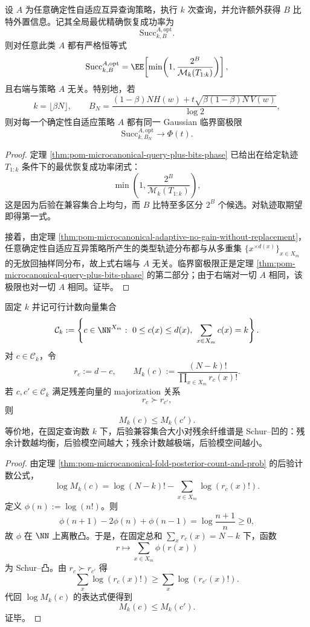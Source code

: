 \begin{theorem}[带外置信息的最优恢复率对策略完全失明]\label{thm:conclusion-microcanonical-query-sidebits-strategy-blind}
设 \(A\) 为任意确定性自适应互异查询策略，执行 \(k\) 次查询，并允许额外获得 \(B\) 比特外置信息。记其全局最优精确恢复成功率为
\[
\mathrm{Succ}^{A,\mathrm{opt}}_{k,B}.
\]
则对任意此类 \(A\) 都有严格恒等式
\[
\mathrm{Succ}^{A,\mathrm{opt}}_{k,B}
=
\EE\!\left[\min\!\left(1,\frac{2^B}{\mathcal M_k(T_{1:k})}\right)\right],
\]
且右端与策略 \(A\) 无关。特别地，若
\[
k=\lfloor \beta N\rfloor,
\qquad
B_N=\frac{(1-\beta)NH(w)+t\sqrt{\beta(1-\beta)N\,V(w)}}{\log 2},
\]
则对每一个确定性自适应策略 \(A\) 都有同一 Gaussian 临界窗极限
\[
\mathrm{Succ}^{A,\mathrm{opt}}_{k,B_N}\longrightarrow \Phi(t).
\]
\end{theorem}
\begin{proof}
定理 \ref{thm:pom-microcanonical-query-plus-bits-phase} 已给出在给定轨迹 \(T_{1:k}\) 条件下的最优恢复成功率闭式：
\[
\min\!\left(1,\frac{2^B}{\mathcal M_k(T_{1:k})}\right),
\]
这是因为后验在兼容集合上均匀，而 \(B\) 比特至多区分 \(2^B\) 个候选。对轨迹取期望即得第一式。

接着，由定理 \ref{thm:pom-microcanonical-adaptive-no-gain-without-replacement}，任意确定性自适应互异策略所产生的类型轨迹分布都与从多重集 \(\{x^{\times d(x)}\}_{x\in X_m}\) 的无放回抽样同分布，故上式右端与 \(A\) 无关。临界窗极限正是定理 \ref{thm:pom-microcanonical-query-plus-bits-phase} 的第二部分；由于右端对一切 \(A\) 相同，该极限也对一切 \(A\) 相同。证毕。
\end{proof}

\begin{theorem}\label{thm:conclusion-posterior-moduli-majorization-monotonicity}
固定 \(k\) 并记可行计数向量集合
\[
\mathcal C_k:=
\left\{
c\in \NN^{X_m}:\ 0\le c(x)\le d(x),\ \sum_{x\in X_m}c(x)=k
\right\}.
\]
对 \(c\in \mathcal C_k\)，令
\[
r_c:=d-c,
\qquad
M_k(c):=\frac{(N-k)!}{\prod_{x\in X_m} r_c(x)!}.
\]
若 \(c,c'\in\mathcal C_k\) 满足残差向量的 majorization 关系
\[
r_c\succ r_{c'},
\]
则
\[
M_k(c)\le M_k(c').
\]
等价地，在固定查询数 \(k\) 下，后验兼容集合大小对残余纤维谱是 Schur--凹的：残余计数越均衡，后验模空间越大；残余计数越极端，后验模空间越小。
\end{theorem}
\begin{proof}
由定理 \ref{thm:pom-microcanonical-fold-posterior-count-and-prob} 的后验计数公式，
\[
\log M_k(c)=\log (N-k)!-\sum_{x\in X_m}\log(r_c(x)!).
\]
定义 \(\phi(n):=\log(n!)\)。则
\[
\phi(n+1)-2\phi(n)+\phi(n-1)=\log\frac{n+1}{n}\ge 0,
\]
故 \(\phi\) 在 \(\NN\) 上离散凸。于是，在固定总和 \(\sum_x r_c(x)=N-k\) 下，函数
\[
r\longmapsto \sum_{x\in X_m}\phi(r(x))
\]
为 Schur--凸。由 \(r_c\succ r_{c'}\) 得
\[
\sum_x \log(r_c(x)!)\ge \sum_x \log(r_{c'}(x)!).
\]
代回 \(\log M_k(c)\) 的表达式便得到
\[
M_k(c)\le M_k(c').
\]
证毕。
\end{proof}


